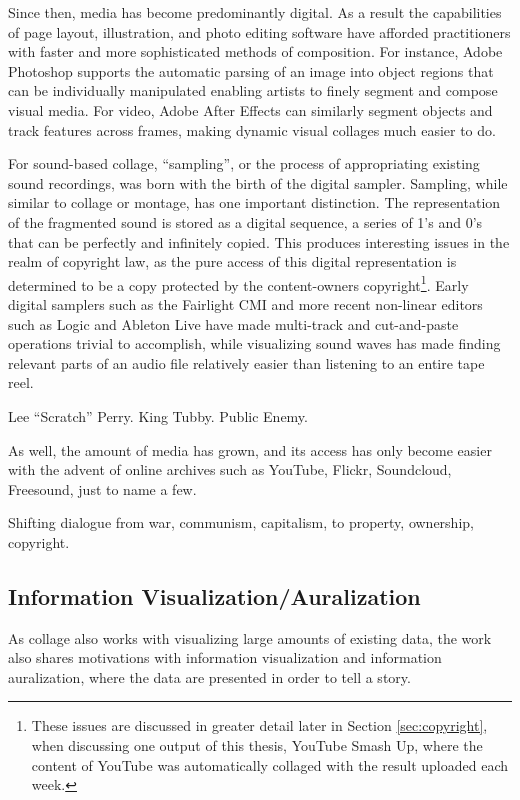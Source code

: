 Since then, media has become predominantly digital.  As a result the capabilities of page layout, illustration, and photo editing software have afforded practitioners with faster and more sophisticated methods of composition.  For instance, Adobe Photoshop supports the automatic parsing of an image into object regions that can be individually manipulated enabling artists to finely segment and compose visual media.  For video, Adobe After Effects can similarly segment objects and track features across frames, making dynamic visual collages much easier to do.  

For sound-based collage, ``sampling'', or the process of appropriating existing sound recordings, was born with the birth of the digital sampler.  Sampling, while similar to collage or montage, has one important distinction.  The representation of the fragmented sound is stored as a digital sequence, a series of 1's and 0's that can be perfectly and infinitely copied.  This produces interesting issues in the realm of copyright law, as the pure access of this digital representation is determined to be a copy protected by the content-owners copyright\footnote{These issues are discussed in greater detail later in Section \ref{sec:copyright}, when discussing one output of this thesis, YouTube Smash Up, where the content of YouTube was automatically collaged with the result uploaded each week.}.  Early digital samplers such as the Fairlight CMI and more recent non-linear editors such as Logic and Ableton Live have made multi-track and cut-and-paste operations trivial to accomplish, while visualizing sound waves has made finding relevant parts of an audio file relatively easier than listening to an entire tape reel.  

Lee ``Scratch'' Perry.  King Tubby.  Public Enemy. 

As well, the amount of media has grown, and its access has only become easier with the advent of online archives such as YouTube, Flickr, Soundcloud, Freesound, just to name a few. 

Shifting dialogue from war, communism, capitalism, to property, ownership, copyright.

\subsection{Information Visualization/Auralization}
As collage also works with visualizing large amounts of existing data, the work also shares motivations with information visualization and information auralization, where the data are presented in order to tell a story.  

